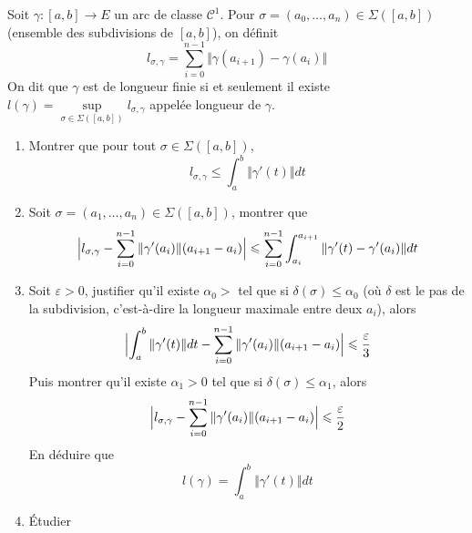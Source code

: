 \documentclass[12pt]{article}
\begin{document}
\begin{exercise}
	Soit $\gamma\colon[a,b]\to E$ un arc de classe $\mathcal{C}^{1}$. Pour $\sigma=(a_{0},\dots,a_{n})\in\Sigma([a,b])$ (ensemble des subdivisions de $[a,b]$), on définit 
	$$l_{\sigma,\gamma}=\sum_{i=0}^{n-1}\Vert \gamma(a_{i+1})-\gamma(a_{i})\Vert$$
	On dit que $\gamma$ est de longueur finie si et seulement il existe $l(\gamma)=\sup\limits_{\sigma\in\Sigma([a,b])}l_{\sigma,\gamma}$ appelée longueur de $\gamma$.

	\begin{enumerate}
		\item Montrer que pour tout $\sigma\in\Sigma([a,b])$, 
		$$l_{\sigma,\gamma}\leqslant\int_{a}^{b}\Vert\gamma'(t)\Vert dt$$
		
		\item Soit $\sigma=(a_{1},\dots,a_{n})\in\Sigma([a,b])$, montrer que 
		$$\Bigl\vert l_{\sigma,\gamma}-\sum_{i=0}^{n-1}\Vert\gamma'(a_{i})\Vert (a_{i+1}-a_{i})\Bigr\vert\leqslant\sum_{i=0}^{n-1}\int_{a_{i}}^{a_{i+1}}\Vert\gamma'(t)-\gamma'(a_{i})\Vert dt$$
		
		\item Soit $\varepsilon>0$, justifier qu'il existe $\alpha_{0}>$ tel que si $\delta(\sigma)\leqslant\alpha_{0}$ (où $\delta$ est le pas de la subdivision, c'est-à-dire la longueur maximale entre deux $a_{i}$), alors 
		$$\Bigl\vert\int_{a}^{b}\Vert \gamma'(t)\Vert dt-\sum_{i=0}^{n-1}\Vert\gamma'(a_{i})\Vert(a_{i+1}-a_{i})\Bigr\vert\leqslant\frac{\varepsilon}{3}$$
		Puis montrer qu'il existe $\alpha_{1}>0$ tel que si $\delta(\sigma)\leqslant\alpha_{1}$, alors 
		$$\Bigl\vert l_{\sigma,\gamma}-\sum_{i=0}^{n-1}\Vert\gamma'(a_{i})\Vert(a_{i+1}-a_{i})\Bigr\vert\leqslant\frac{\varepsilon}{2}$$
		En déduire que 
		$$l(\gamma)=\int_{a}^{b}\Vert\gamma'(t)\Vert dt$$
		
		\item Étudier 
	\end{enumerate}
\end{exercise}
\end{document}
